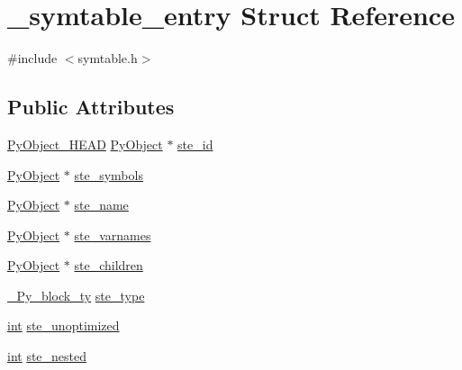 \hypertarget{struct__symtable__entry}{}\section{\+\_\+symtable\+\_\+entry Struct Reference}
\label{struct__symtable__entry}


{\ttfamily \#include $<$symtable.\+h$>$}

\subsection*{Public Attributes}
\begin{DoxyCompactItemize}
\item 
\mbox{\hyperlink{_python27_2object_8h_a0bf35c1f3ea13f925de94d8593db3b7e}{Py\+Object\+\_\+\+H\+E\+AD}} \mbox{\hyperlink{_python27_2object_8h_aadc84ac7aed2cfa6f20c25f62bf3dac7}{Py\+Object}} $\ast$ \mbox{\hyperlink{struct__symtable__entry_a5592e20eb030643d8f0ac15eb2a420a8}{ste\+\_\+id}}
\item 
\mbox{\hyperlink{_python27_2object_8h_aadc84ac7aed2cfa6f20c25f62bf3dac7}{Py\+Object}} $\ast$ \mbox{\hyperlink{struct__symtable__entry_a9861a26aa97ecd761978f0945f597198}{ste\+\_\+symbols}}
\item 
\mbox{\hyperlink{_python27_2object_8h_aadc84ac7aed2cfa6f20c25f62bf3dac7}{Py\+Object}} $\ast$ \mbox{\hyperlink{struct__symtable__entry_a10a3fb305050313babc7322ffb401456}{ste\+\_\+name}}
\item 
\mbox{\hyperlink{_python27_2object_8h_aadc84ac7aed2cfa6f20c25f62bf3dac7}{Py\+Object}} $\ast$ \mbox{\hyperlink{struct__symtable__entry_a7c4f7b2d6a187257a2966cf80c447d62}{ste\+\_\+varnames}}
\item 
\mbox{\hyperlink{_python27_2object_8h_aadc84ac7aed2cfa6f20c25f62bf3dac7}{Py\+Object}} $\ast$ \mbox{\hyperlink{struct__symtable__entry_a95a1b4f65170d448fe57a66fd73924f5}{ste\+\_\+children}}
\item 
\mbox{\hyperlink{symtable_8h_a027dc810c50764bb9a23c5c30ae99f1f}{\+\_\+\+Py\+\_\+block\+\_\+ty}} \mbox{\hyperlink{struct__symtable__entry_a9a070f2be73f328f86b565c0d3a1439f}{ste\+\_\+type}}
\item 
\mbox{\hyperlink{warnings_8h_a74f207b5aa4ba51c3a2ad59b219a423b}{int}} \mbox{\hyperlink{struct__symtable__entry_a6835ccc788cf7ee545d92ce2efa15202}{ste\+\_\+unoptimized}}
\item 
\mbox{\hyperlink{warnings_8h_a74f207b5aa4ba51c3a2ad59b219a423b}{int}} \mbox{\hyperlink{struct__symtable__entry_a01768336ee197e6e432af802e3833a76}{ste\+\_\+nested}}

\end{DoxyCompactItemize}
